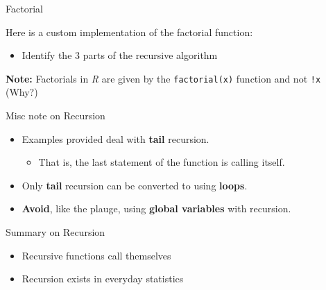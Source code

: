 \begin{frame}[fragile]{Factorial}

Here is a custom implementation of the factorial function:

\begin{Shaded}
\begin{Highlighting}[]
\StringTok{ }
  \StringTok{ }\NormalTok{)\{}
    \NormalTok{(}\NormalTok{)}
    \NormalTok{))}
  \NormalTok{\}}
\NormalTok{\}}
\end{Highlighting}
\end{Shaded}

\begin{itemize}
\tightlist
\item
  Identify the 3 parts of the recursive algorithm
\end{itemize}

\textbf{Note:} Factorials in \emph{R} are given by the
\texttt{factorial(x)} function and not \texttt{!x} (Why?)

\end{frame}

\begin{frame}{Misc note on Recursion}

\begin{itemize}
\tightlist
\item
  Examples provided deal with \textbf{tail} recursion.

  \begin{itemize}
  \tightlist
  \item
    That is, the last statement of the function is calling itself.
  \end{itemize}
\item
  Only \textbf{tail} recursion can be converted to using \textbf{loops}.
\item
  \textbf{Avoid}, like the plauge, using \textbf{global variables} with
  recursion.
\end{itemize}

\end{frame}

\begin{frame}{Summary on Recursion}

\begin{itemize}
\tightlist
\item
  Recursive functions call themselves
\item
  Recursion exists in everyday statistics
\end{itemize}

\end{frame}

